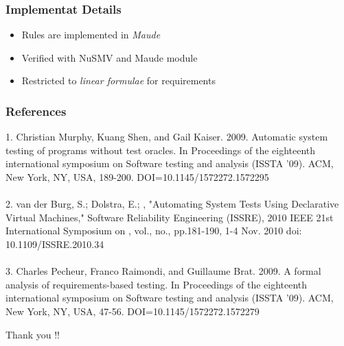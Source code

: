 \documentclass[compress,red]{beamer}
\begin{document}
\frame
{
	\frametitle{Implementat Details}
	\begin{itemize}
		\pause
		\item Rules are implemented in \textit{Maude}
		\pause
		\item Verified with NuSMV and Maude module
		\pause
		\item Restricted to \textit{linear formulae} for requirements
	\end{itemize}
}

\begin{frame}[fragile]

	\frametitle{References}
\small{
	1. Christian Murphy, Kuang Shen, and Gail Kaiser. 2009. Automatic system testing of programs without test oracles. In Proceedings of the eighteenth international symposium on Software testing and analysis (ISSTA '09). ACM, New York, NY, USA, 189-200. DOI=10.1145/1572272.1572295  \\
\ \\
	2. van der Burg, S.; Dolstra, E.; , "Automating System Tests Using Declarative Virtual Machines," Software Reliability Engineering (ISSRE), 2010 IEEE 21st International Symposium on , vol., no., pp.181-190, 1-4 Nov. 2010 doi: 10.1109/ISSRE.2010.34 \\ 
\ \\
	3. Charles Pecheur, Franco Raimondi, and Guillaume Brat. 2009. A formal analysis of requirements-based testing. In Proceedings of the eighteenth international symposium on Software testing and analysis (ISSTA '09). ACM, New York, NY, USA, 47-56. DOI=10.1145/1572272.1572279 \\
}
\end{frame}

\frame
{
	\begin{center}
		\Large{Thank you !!}
	\end{center}
	
}
\end{document}
